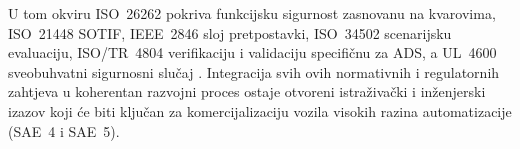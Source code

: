 U tom okviru ISO~26262 pokriva funkcijsku sigurnost zasnovanu na kvarovima, ISO~21448 SOTIF, IEEE~2846 sloj pretpostavki, ISO~34502 scenarijsku evaluaciju, ISO/TR~4804 verifikaciju i validaciju specifičnu za ADS, a UL~4600 sveobuhvatni sigurnosni slučaj \cite{shinde2026reimagining}. Integracija svih ovih normativnih i regulatornih zahtjeva u koherentan razvojni proces ostaje otvoreni istraživački i inženjerski izazov koji će biti ključan za komercijalizaciju vozila visokih razina automatizacije (SAE~4 i SAE~5).
